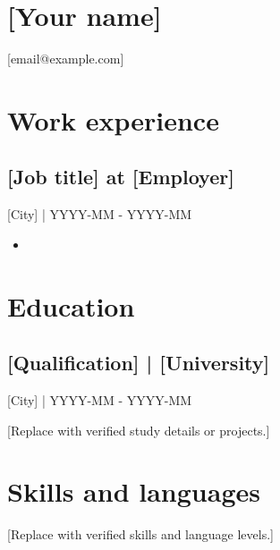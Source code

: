 \documentclass[11pt,a4paper]{article}
\begin{document}
\section*{[Your name]}
[email@example.com]\par
[Phone / Telefon]\par
\section*{Work experience}
\subsection*{[Job title] at [Employer]}
[City] | YYYY-MM - YYYY-MM\par
\begin{itemize}
\item [Replace with a verified responsibility or achievement.]
\end{itemize}
\section*{Education}
\subsection*{[Qualification] | [University]}
[City] | YYYY-MM - YYYY-MM\par
[Replace with verified study details or projects.]\par
\section*{Skills and languages}
[Replace with verified skills and language levels.]\par
\end{document}

